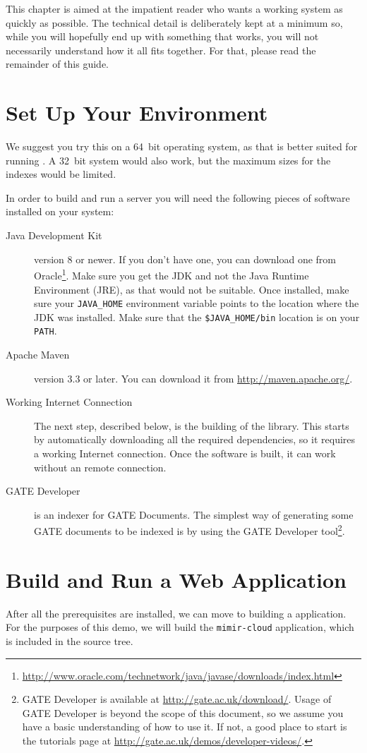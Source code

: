 This chapter is aimed at the impatient reader who wants a working system as
quickly as possible. The technical detail is deliberately kept at a minimum so,
while you will hopefully end up with something that works, you will not
necessarily understand how it all fits together. For that, please read the
remainder of this guide.

\section{Set Up Your Environment}
We suggest you try this on a 64~bit operating system, as that is better suited
for running \Mimir{}. A 32~bit system would also work, but the maximum sizes for
the indexes would be limited.

In order to build and run a \Mimir{} server you will need the following pieces
of software installed on your system:
\begin{description}
  \item[Java Development Kit] version 8 or newer. If you don't have one, you can
  download one from 
  Oracle\footnote{\url{http://www.oracle.com/technetwork/java/javase/downloads/index.html}}.
  Make sure you get the JDK and not the Java Runtime Environment (JRE), as that
  would not be suitable. Once installed, make sure your \verb!JAVA_HOME!
  environment variable points to the location where the JDK was installed.  Make
  sure that the \verb!$JAVA_HOME/bin! location is on your \verb!PATH!.
  \item[Apache Maven] version 3.3 or later. You can download it from
  \url{http://maven.apache.org/}.
  \item[Working Internet Connection] The next step, described below, is the
  building of the \Mimir{} library. This starts by automatically downloading all
  the required dependencies, so it requires a working Internet connection. Once
  the software is built, it can work without an remote connection.
  \item[GATE Developer] \Mimir{} is an indexer for GATE Documents. The simplest
  way of generating some GATE documents to be indexed is by using the GATE
  Developer tool\footnote{GATE Developer is available at
  \url{http://gate.ac.uk/download/}. Usage of GATE Developer is beyond the scope
  of this document, so we assume you have a basic understanding of how to use
  it. If not, a good place to start is the tutorials page at
  \url{http://gate.ac.uk/demos/developer-videos/}.}. 
\end{description}
%
\section{Build and Run a \Mimir{} Web Application}
%
After all the prerequisites are installed, we can move to building a \Mimir{}
application. For the purposes of this demo, we will build the {\tt mimir-cloud}
application, which is included in the source tree.

